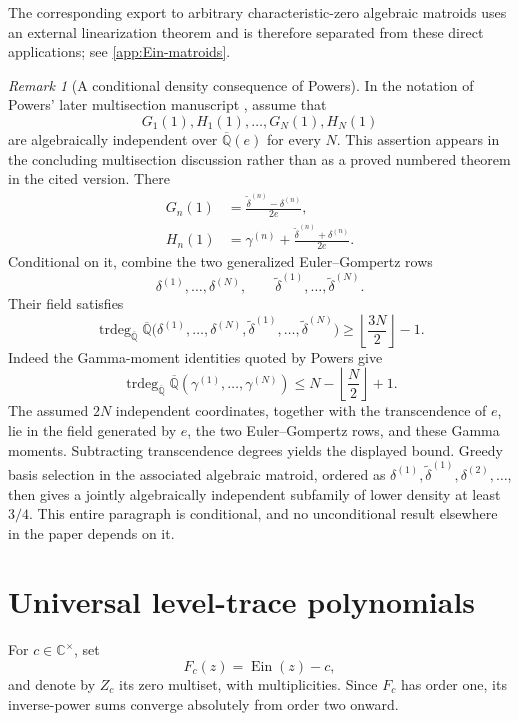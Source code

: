 \documentclass[11pt]{article}
\theoremstyle{keio}
\theoremstyle{definition}
\theoremstyle{remark}
\newtheorem{remark}[theorem]{Remark}
\newcommand{\Qbar}{\overline{\mathbb Q}}
\newcommand{\C}{\mathbb C}
\newcommand{\Ein}{\operatorname{Ein}}
\newcommand{\trdeg}{\operatorname{trdeg}}
\begin{document}
The corresponding export to arbitrary characteristic-zero algebraic
matroids uses an external linearization theorem and is therefore separated
from these direct applications; see \cref{app:Ein-matroids}.

\begin{remark}[A conditional density consequence of Powers]
\label{rem:Powers-conditional}
In the notation of Powers' later multisection manuscript
\cite[\S5]{Powers2025}, assume that
\[
 G_1(1),H_1(1),\ldots,G_N(1),H_N(1)
\]
are algebraically independent over \(\Qbar(e)\) for every \(N\).  This
assertion appears in the concluding multisection discussion rather than as
a proved numbered theorem in the cited version.  There
\begin{align*}
 G_n(1)&=\frac{\widetilde\delta^{(n)}-\delta^{(n)}}{2e},\\
 H_n(1)&=\gamma^{(n)}+
 \frac{\widetilde\delta^{(n)}+\delta^{(n)}}{2e}.
\end{align*}
Conditional on it, combine the two generalized Euler--Gompertz rows
\[
 \delta^{(1)},\ldots,\delta^{(N)},\qquad
 \widetilde\delta^{(1)},\ldots,\widetilde\delta^{(N)}.
\]
Their field satisfies
\[
 \trdeg_{\Qbar}\Qbar\bigl(
 \delta^{(1)},\ldots,\delta^{(N)},
 \widetilde\delta^{(1)},\ldots,\widetilde\delta^{(N)}\bigr)
 \ge\left\lfloor\frac{3N}{2}\right\rfloor-1.
\]
Indeed the Gamma-moment identities quoted by Powers give
\[
 \trdeg_{\Qbar}\Qbar(\gamma^{(1)},\ldots,\gamma^{(N)})
 \le N-\left\lfloor\frac N2\right\rfloor+1.
\]
The assumed \(2N\) independent coordinates, together with the
transcendence of \(e\), lie in the field generated by \(e\), the two
Euler--Gompertz rows, and these Gamma moments.  Subtracting transcendence
degrees yields the displayed bound.  Greedy basis selection in the
associated algebraic matroid, ordered as
\(\delta^{(1)},\widetilde\delta^{(1)},\delta^{(2)},\ldots\), then gives a
jointly algebraically independent subfamily of lower density at least
\(3/4\).  This entire paragraph is conditional, and no unconditional
result elsewhere in the paper depends on it.
\end{remark}

\section{Universal level-trace polynomials}
\label{sec:trace-polynomials}

For \(c\in\C^\times\), set
\[
 F_c(z)=\Ein(z)-c,
\]
and denote by \(Z_c\) its zero multiset, with multiplicities.  Since \(F_c\)
has order one, its inverse-power sums converge absolutely from order two
onward.
\end{document}
